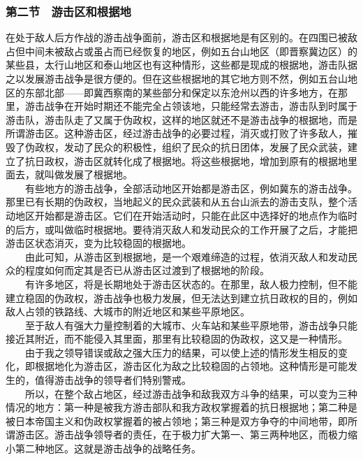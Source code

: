 \documentclass[cn,11pt,chinese]{elegantbook}
\def\myformat#1{\hfil\hfil #1}
\begin{document}
\subsubsection*{\myformat{第二节　游击区和根据地}}
在处于敌人后方作战的游击战争面前，游击区和根据地是有区别的。在四围已被敌占但中间未被敌占或虽占而已经恢复的地区，例如五台山地区（即晋察冀边区）的某些县，太行山地区和泰山地区也有这种情形，这些都是现成的根据地，游击队据之以发展游击战争是很方便的。但在这些根据地的其它地方则不然，例如五台山地区的东部北部——即冀西察南的某些部分和保定以东沧州以西的许多地方，在那里，游击战争在开始时期还不能完全占领该地，只能经常去游击，游击队到时属于游击队，游击队走了又属于伪政权，这样的地区就还不是游击战争的根据地，而是所谓游击区。这种游击区，经过游击战争的必要过程，消灭或打败了许多敌人，摧毁了伪政权，发动了民众的积极性，组织了民众的抗日团体，发展了民众武装，建立了抗日政权，游击区就转化成了根据地。将这些根据地，增加到原有的根据地里面去，就叫做发展了根据地。\\
　　有些地方的游击战争，全部活动地区开始都是游击区，例如冀东的游击战争。那里已有长期的伪政权，当地起义的民众武装和从五台山派去的游击支队，整个活动地区开始都是游击区。它们在开始活动时，只能在此区中选择好的地点作为临时的后方，或叫做临时根据地。要待消灭敌人和发动民众的工作开展了之后，才能把游击区状态消灭，变为比较稳固的根据地。\\
　　由此可知，从游击区到根据地，是一个艰难缔造的过程，依消灭敌人和发动民众的程度如何而定其是否已从游击区过渡到了根据地的阶段。\\
　　有许多地区，将是长期地处于游击区状态的。在那里，敌人极力控制，但不能建立稳固的伪政权，游击战争也极力发展，但无法达到建立抗日政权的目的，例如敌人占领的铁路线、大城市的附近地区和某些平原地区。\\
　　至于敌人有强大力量控制着的大城市、火车站和某些平原地带，游击战争只能接近其附近，而不能侵入其里面，那里有比较稳固的伪政权，这又是一种情形。\\
　　由于我之领导错误或敌之强大压力的结果，可以使上述的情形发生相反的变化，即根据地化为游击区，游击区化为敌之比较稳固的占领地。这种情形是可能发生的，值得游击战争的领导者们特别警戒。\\
　　所以，在整个敌占地区，经过游击战争和敌我双方斗争的结果，可以变为三种情况的地方：第一种是被我方游击部队和我方政权掌握着的抗日根据地；第二种是被日本帝国主义和伪政权掌握着的被占领地；第三种是双方争夺的中间地带，即所谓游击区。游击战争领导者的责任，在于极力扩大第一、第三两种地区，而极力缩小第二种地区。这就是游击战争的战略任务。\\
\end{document}
